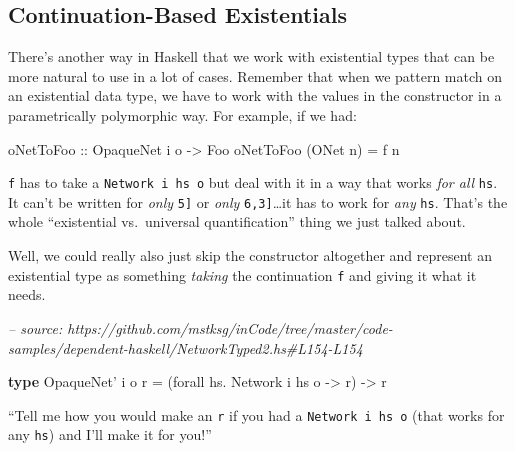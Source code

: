 \documentclass[]{article}
\newenvironment{Shaded}{}{}
\newcommand{\CommentTok}[1]{\textcolor[rgb]{0.38,0.63,0.69}{\textit{#1}}}
\newcommand{\DataTypeTok}[1]{\textcolor[rgb]{0.56,0.13,0.00}{#1}}
\newcommand{\FunctionTok}[1]{\textcolor[rgb]{0.02,0.16,0.49}{#1}}
\newcommand{\KeywordTok}[1]{\textcolor[rgb]{0.00,0.44,0.13}{\textbf{#1}}}
\newcommand{\NormalTok}[1]{#1}
\newcommand{\OtherTok}[1]{\textcolor[rgb]{0.00,0.44,0.13}{#1}}
\begin{document}
\hypertarget{continuation-based-existentials}{%
\subsection{Continuation-Based
Existentials}\label{continuation-based-existentials}}

There's another way in Haskell that we work with existential types that can be
more natural to use in a lot of cases. Remember that when we pattern match on an
existential data type, we have to work with the values in the constructor in a
parametrically polymorphic way. For example, if we had:

\begin{Shaded}
\begin{Highlighting}[]
\OtherTok{oNetToFoo ::} \DataTypeTok{OpaqueNet}\NormalTok{ i o }\OtherTok{->} \DataTypeTok{Foo}
\NormalTok{oNetToFoo (}\DataTypeTok{ONet}\NormalTok{ n) }\FunctionTok{=}\NormalTok{ f n}
\end{Highlighting}
\end{Shaded}

\texttt{f} has to take a \texttt{Network\ i\ hs\ o} but deal with it in a way
that works \emph{for all} \texttt{hs}. It can't be written for \emph{only}
\texttt{\textquotesingle{}{[}5{]}} or \emph{only}
\texttt{\textquotesingle{}{[}6,3{]}}\ldots{}it has to work for \emph{any}
\texttt{hs}. That's the whole ``existential vs.~universal quantification'' thing
we just talked about.

Well, we could really also just skip the constructor altogether and represent an
existential type as something \emph{taking} the continuation \texttt{f} and
giving it what it needs.

\begin{Shaded}
\begin{Highlighting}[]
\CommentTok{-- source: https://github.com/mstksg/inCode/tree/master/code-samples/dependent-haskell/NetworkTyped2.hs#L154-L154}

\KeywordTok{type} \DataTypeTok{OpaqueNet'}\NormalTok{ i o r }\FunctionTok{=}\NormalTok{ (forall hs}\FunctionTok{.} \DataTypeTok{Network}\NormalTok{ i hs o }\OtherTok{->}\NormalTok{ r) }\OtherTok{->}\NormalTok{ r}
\end{Highlighting}
\end{Shaded}

``Tell me how you would make an \texttt{r} if you had a
\texttt{Network\ i\ hs\ o} (that works for any \texttt{hs}) and I'll make it for
you!''
\end{document}
